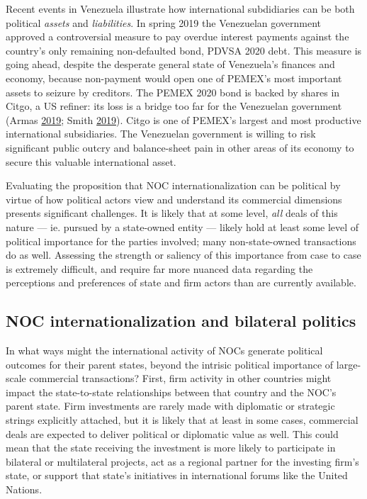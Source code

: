 \documentclass[11pt,]{book}
\begin{document}
Recent events in Venezuela illustrate how international subdidiaries can be both political \emph{assets} and \emph{liabilities}. In spring 2019 the Venezuelan government approved a controversial measure to pay overdue interest payments against the country's only remaining non-defaulted bond, PDVSA 2020 debt. This measure is going ahead, despite the desperate general state of Venezuela's finances and economy, because non-payment would open one of PEMEX's most important assets to seizure by creditors. The PEMEX 2020 bond is backed by shares in Citgo, a US refiner: its loss is a bridge too far for the Venezuelan government (Armas \protect\hyperlink{ref-armas_venezuela_2019}{2019}; Smith \protect\hyperlink{ref-smith_venezuela_2019}{2019}). Citgo is one of PEMEX's largest and most productive international subsidiaries. The Venezuelan government is willing to risk significant public outcry and balance-sheet pain in other areas of its economy to secure this valuable international asset.

Evaluating the proposition that NOC internationalization can be political by virtue of how political actors view and understand its commercial dimensions presents significant challenges. It is likely that at some level, \emph{all} deals of this nature --- ie. pursued by a state-owned entity --- likely hold at least some level of political importance for the parties involved; many non-state-owned transactions do as well. Assessing the strength or saliency of this importance from case to case is extremely difficult, and require far more nuanced data regarding the perceptions and preferences of state and firm actors than are currently available.

\hypertarget{noc-internationalization-and-bilateral-politics}{%
\subsection{NOC internationalization and bilateral politics}\label{noc-internationalization-and-bilateral-politics}}

In what ways might the international activity of NOCs generate political outcomes for their parent states, beyond the intrisic political importance of large-scale commercial transactions? First, firm activity in other countries might impact the state-to-state relationships between that country and the NOC's parent state. Firm investments are rarely made with diplomatic or strategic strings explicitly attached, but it is likely that at least in some cases, commercial deals are expected to deliver political or diplomatic value as well. This could mean that the state receiving the investment is more likely to participate in bilateral or multilateral projects, act as a regional partner for the investing firm's state, or support that state's initiatives in international forums like the United Nations.
\end{document}
